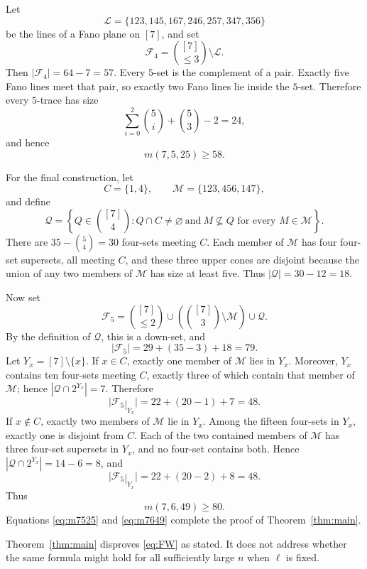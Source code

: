 \documentclass[11pt]{amsart}
\newcommand{\tr}{\mathbin{|}}
\newcommand{\cF}{\mathcal F}
\newcommand{\cL}{\mathcal L}
\newcommand{\cM}{\mathcal M}
\newcommand{\cQ}{\mathcal Q}
\begin{document}
Let
\[
  \cL=\{123,145,167,246,257,347,356\}
\]
be the lines of a Fano plane on $[7]$, and set
\[
  \cF_4=\binom{[7]}{\le3}\setminus\cL.
\]
Then $|\cF_4|=64-7=57$. Every $5$-set is the complement of a pair.
Exactly five Fano lines meet that pair, so exactly two Fano lines lie
inside the $5$-set. Therefore every $5$-trace has size
\[
  \sum_{i=0}^{2}\binom5i+\binom53-2=24,
\]
and hence
\begin{equation}\label{eq:m7525}
  m(7,5,25)\ge58.
\end{equation}

For the final construction, let
\[
  C=\{1,4\},\qquad
  \cM=\{123,456,147\},
\]
and define
\[
  \cQ=\left\{Q\in\binom{[7]}4:
  Q\cap C\ne\varnothing\ \text{and}\ M\nsubseteq Q
  \text{ for every }M\in\cM\right\}.
\]
There are $35-\binom54=30$ four-sets meeting $C$. Each member of
$\cM$ has four four-set supersets, all meeting $C$, and these three
upper cones are disjoint because the union of any two members of
$\cM$ has size at least five. Thus $|\cQ|=30-12=18$.

Now set
\begin{equation}\label{eq:F7}
  \cF_5=\binom{[7]}{\le2}
  \cup\left(\binom{[7]}3\setminus\cM\right)\cup\cQ.
\end{equation}
By the definition of $\cQ$, this is a down-set, and
\[
  |\cF_5|=29+(35-3)+18=79.
\]
Let $Y_x=[7]\setminus\{x\}$. If $x\in C$, exactly one member of
$\cM$ lies in $Y_x$. Moreover, $Y_x$ contains ten four-sets meeting
$C$, exactly three of which contain that member of $\cM$; hence
$|\cQ\cap2^{Y_x}|=7$. Therefore
\[
  |\cF_5\tr_{Y_x}|=22+(20-1)+7=48.
\]
If $x\notin C$, exactly two members of $\cM$ lie in $Y_x$. Among the
fifteen four-sets in $Y_x$, exactly one is disjoint from $C$. Each of
the two contained members of $\cM$ has three four-set supersets in
$Y_x$, and no four-set contains both. Hence
$|\cQ\cap2^{Y_x}|=14-6=8$, and
\[
  |\cF_5\tr_{Y_x}|=22+(20-2)+8=48.
\]
Thus
\begin{equation}\label{eq:m7649}
  m(7,6,49)\ge80.
\end{equation}
Equations \eqref{eq:m7525} and \eqref{eq:m7649} complete the proof of
Theorem~\ref{thm:main}.

Theorem~\ref{thm:main} disproves \eqref{eq:FW} as stated. It does not
address whether the same formula might hold for all sufficiently large
$n$ when $\ell$ is fixed.
\end{document}

